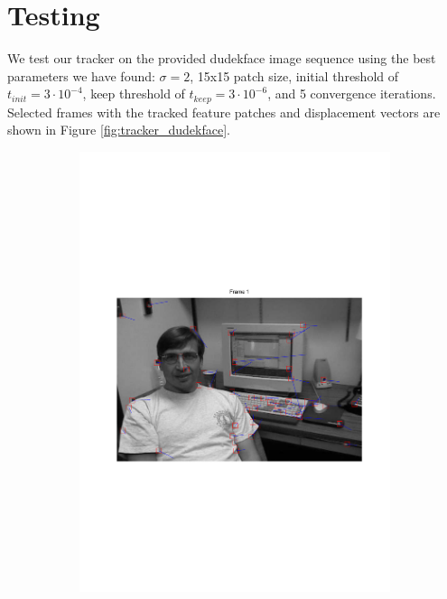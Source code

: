 \documentclass[11pt,a4paper]{article}
\begin{document}
\section{Testing}
%
We test our tracker on the provided dudekface image sequence using the best parameters we have found: $\sigma = 2$, 15x15 patch size, initial threshold of $t_{init} = 3 \cdot 10^{-4}$, keep threshold of $t_{keep} = 3 \cdot 10^{-6}$, and 5 convergence iterations. Selected frames with the tracked feature patches and displacement vectors are shown in Figure \ref{fig:tracker_dudekface}.

\begin{figure}
\centering
\begin{subfigure}{0.45\textwidth}
\includegraphics[scale=0.4,trim={120 250 0 250}]{img/tracker_dudekface_1.pdf}
\end{subfigure}
\begin{subfigure}{0.45\textwidth}

\end{subfigure}
\end{figure}
\end{document}
